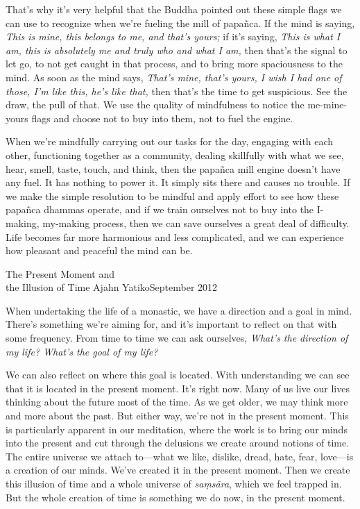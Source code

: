 That's why it's very helpful that the Buddha pointed out these simple 
flags we can use to recognize when we're fueling the mill of papañca. 
If the mind is saying, \emph{This is mine, this belongs to me, and 
that's yours;} if it's saying, \emph{This is what I am, this is 
absolutely me and truly who and what I am,} then that's the signal to 
let go, to not get caught in that process, and to bring more 
spaciousness to the mind. As soon as the mind says, \emph{That's mine, 
that's yours, I wish I had one of those, I'm like this, he's like 
that,} then that's the time to get suspicious. See the draw, the pull 
of that. We use the quality of mindfulness to notice the me-mine-yours 
flags and choose not to buy into them, not to fuel the engine.

When we're mindfully carrying out our tasks for the day, engaging with 
each other, functioning together as a community, dealing skillfully 
with what we see, hear, smell, taste, touch, and think, then the 
papañca mill engine doesn't have any fuel. It has nothing to power it. 
It simply sits there and causes no trouble. If we make the simple 
resolution to be mindful and apply effort to see how these papañca 
dhammas operate, and if we train ourselves not to buy into the 
I-making, my-making process, then we can save ourselves a great deal of 
difficulty. Life becomes far more harmonious and less complicated, and 
we can experience how pleasant and peaceful the mind can be.

{The Present Moment and\\the Illusion of Time}
{Ajahn Yatiko}{September 2012}

When undertaking the life of a monastic, we have a direction and a goal 
in mind. There's something we're aiming for, and it's important to 
reflect on that with some frequency. From time to time we can ask 
ourselves, \emph{What's the direction of my life? What's the goal of my 
life?}

We can also reflect on where this goal is located. With understanding 
we can see that it is located in the present moment. It's right now. 
Many of us live our lives thinking about the future most of the time. 
As we get older, we may think more and more about the past. But either 
way, we're not in the present moment. This is particularly apparent in 
our meditation, where the work is to bring our minds into the present 
and cut through the delusions we create around notions of time. The 
entire universe we attach to---what we like, dislike, dread, hate, 
fear, love---is a creation of our minds. We've created it in the 
present moment. Then we create this illusion of time and a whole 
universe of \emph{saṃsāra}, which we feel trapped in. But the whole 
creation of time is something we do now, in the present moment.

